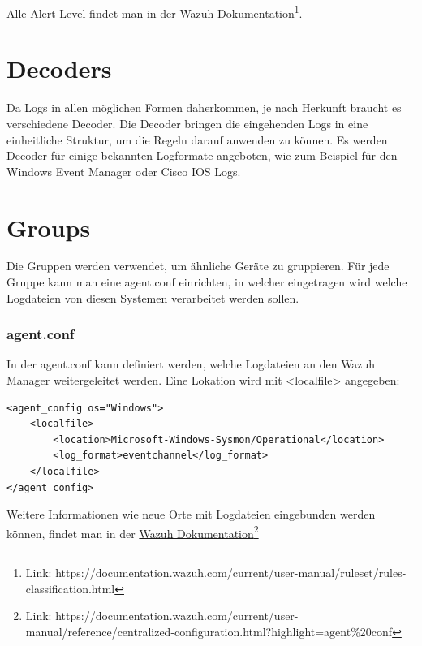 Alle Alert Level findet man in der \href{https://documentation.wazuh.com/current/user-manual/ruleset/rules-classification.html}{Wazuh Dokumentation}\footnote{Link: https://documentation.wazuh.com/current/user-manual/ruleset/rules-classification.html}.

\section{Decoders}
Da Logs in allen möglichen Formen daherkommen, je nach Herkunft braucht es verschiedene Decoder.
Die Decoder bringen die eingehenden Logs in eine einheitliche Struktur, um die Regeln darauf anwenden zu können.
Es werden Decoder für einige bekannten Logformate angeboten, wie zum Beispiel für den Windows Event Manager oder Cisco IOS Logs.


\section{Groups}
Die Gruppen werden verwendet, um ähnliche Geräte zu gruppieren.
Für jede Gruppe kann man eine agent.conf einrichten, in welcher eingetragen wird welche Logdateien von diesen Systemen verarbeitet werden sollen. 

\subsubsection{agent.conf}
In der agent.conf kann definiert werden, welche Logdateien an den Wazuh Manager weitergeleitet werden. 
Eine Lokation wird mit <localfile> angegeben:
\begin{lstlisting}
<agent_config os="Windows">
    <localfile>
        <location>Microsoft-Windows-Sysmon/Operational</location>
        <log_format>eventchannel</log_format>
    </localfile>
</agent_config>
\end{lstlisting}
Weitere Informationen wie neue Orte mit Logdateien eingebunden werden können, findet man in der \href{https://documentation.wazuh.com/current/user-manual/reference/centralized-configuration.html?highlight=agent%20conf}{Wazuh Dokumentation}\footnote{Link: https://documentation.wazuh.com/current/user-manual/reference/centralized-configuration.html?highlight=agent\%20conf}